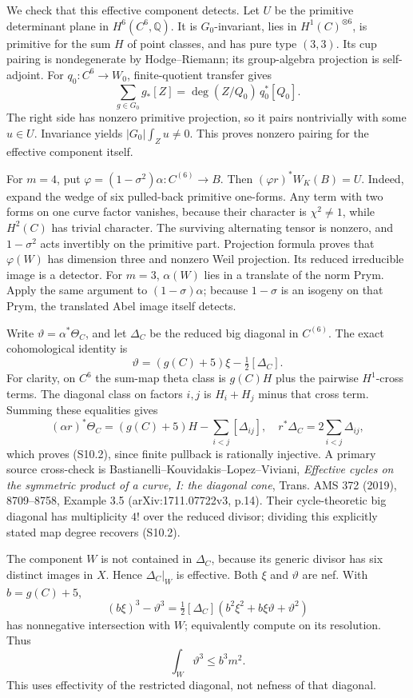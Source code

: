 We check that this effective component detects.
Let \(U\) be the primitive determinant plane in \(H^6(C^6,\mathbb Q)\).
It is \(G_0\)-invariant, lies in \(H^1(C)^{\otimes6}\), is primitive
for the sum \(H\) of point classes, and has pure type \((3,3)\).
Its cup pairing is nondegenerate by Hodge--Riemann; its group-algebra
projection is self-adjoint.
For \(q_0:C^6\to W_0\), finite-quotient transfer gives
\[
\sum_{g\in G_0}g_*[Z]=\deg(Z/Q_0)\,q_0^*[Q_0].
\]
The right side has nonzero primitive projection, so it pairs
nontrivially with some \(u\in U\).
Invariance yields \(|G_0|\int_Zu\ne0\).
This proves nonzero pairing for the effective component itself.

For \(m=4\), put \(\varphi=(1-\sigma^2)\alpha:C^{(6)}\to B\).
Then \((\varphi r)^*W_K(B)=U\).
Indeed, expand the wedge of six pulled-back primitive one-forms.
Any term with two forms on one curve factor vanishes, because their
character is \(\chi^2\ne1\), while \(H^2(C)\) has trivial character.
The surviving alternating tensor is nonzero, and \(1-\sigma^2\)
acts invertibly on the primitive part.
Projection formula proves that \(\varphi(W)\) has dimension three
and nonzero Weil projection. Its reduced irreducible image is a detector.
For \(m=3\), \(\alpha(W)\) lies in a translate of the norm Prym.
Apply the same argument to \((1-\sigma)\alpha\); because
\(1-\sigma\) is an isogeny on that Prym, the translated Abel image
itself detects.

Write \(\vartheta=\alpha^*\Theta_C\), and let \(\Delta_C\) be the reduced
big diagonal in \(C^{(6)}\). The exact cohomological identity is
\[
\vartheta=(g(C)+5)\xi-\tfrac12[\Delta_C].                    \tag{S10.2}
\]
For clarity, on \(C^6\) the sum-map theta class is \(g(C)H\)
plus the pairwise \(H^1\)-cross terms. The diagonal class on factors
\(i,j\) is \(H_i+H_j\) minus that cross term.
Summing these equalities gives
\[
(\alpha r)^*\Theta_C=(g(C)+5)H-\sum_{i<j}[\Delta_{ij}],
\quad r^*\Delta_C=2\sum_{i<j}\Delta_{ij},
\]
which proves (S10.2), since finite pullback is rationally injective.
A primary source cross-check is
Bastianelli--Kouvidakis--Lopez--Viviani,
\emph{Effective cycles on the symmetric product of a curve, I:
the diagonal cone}, Trans. AMS 372 (2019), 8709--8758,
Example 3.5 (arXiv:1711.07722v3, p.14).
Their cycle-theoretic big diagonal has multiplicity \(4!\) over
the reduced divisor; dividing this explicitly stated map degree
recovers (S10.2).

The component \(W\) is not contained in \(\Delta_C\), because its
generic divisor has six distinct images in \(X\).
Hence \(\Delta_C|_W\) is effective.
Both \(\xi\) and \(\vartheta\) are nef. With \(b=g(C)+5\),
\[
(b\xi)^3-\vartheta^3
=\tfrac12[\Delta_C](b^2\xi^2+b\xi\vartheta+\vartheta^2)
\]
has nonnegative intersection with \(W\); equivalently compute on its
resolution. Thus
\[
\int_W\vartheta^3\le b^3m^2.                               \tag{S10.3}
\]
This uses effectivity of the restricted diagonal, not nefness of that
diagonal.

